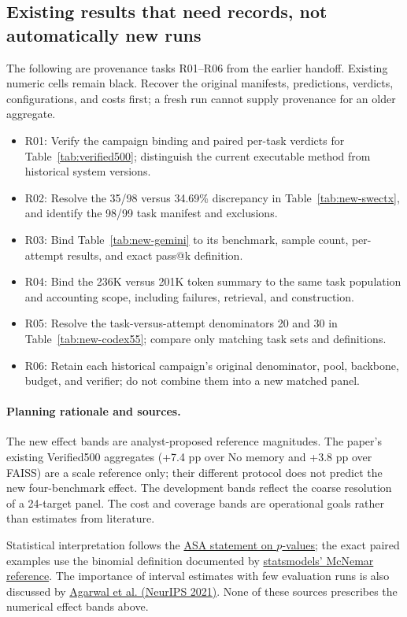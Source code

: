 \subsection{Existing results that need records, not automatically new runs}
The following are provenance tasks R01--R06 from the earlier handoff. Existing
numeric cells remain black. Recover the original manifests, predictions,
verdicts, configurations, and costs first; a fresh run cannot supply provenance
for an older aggregate.
\begin{itemize}
\item R01: Verify the campaign binding and paired per-task verdicts for
Table~\ref{tab:verified500}; distinguish the current executable method from
historical system versions.
\item R02: Resolve the 35/98 versus 34.69\% discrepancy in
Table~\ref{tab:new-swectx}, and identify the 98/99 task manifest and exclusions.
\item R03: Bind Table~\ref{tab:new-gemini} to its benchmark, sample count,
per-attempt results, and exact pass@k definition.
\item R04: Bind the 236K versus 201K token summary to the same task population
and accounting scope, including failures, retrieval, and construction.
\item R05: Resolve the task-versus-attempt denominators 20 and 30 in
Table~\ref{tab:new-codex55}; compare only matching task sets and definitions.
\item R06: Retain each historical campaign's original denominator, pool,
backbone, budget, and verifier; do not combine them into a new matched panel.
\end{itemize}

\paragraph{Planning rationale and sources.}
The new effect bands are analyst-proposed reference magnitudes. The paper's
existing Verified500 aggregates (+7.4 pp over No memory and +3.8 pp over FAISS)
are a scale reference only; their different protocol does not predict the
new four-benchmark effect. The development bands reflect the coarse resolution
of a 24-target panel. The cost and coverage bands are operational goals rather
than estimates from literature.

Statistical interpretation follows the
\href{https://www.amstat.org/asa/files/pdfs/p-valuestatement.pdf}{ASA statement on $p$-values};
the exact paired examples use the binomial definition documented by
\href{https://www.statsmodels.org/stable/generated/statsmodels.stats.contingency_tables.mcnemar.html}{statsmodels' McNemar reference}.
The importance of interval estimates with few evaluation runs is also discussed
by \href{https://proceedings.neurips.cc/paper/2021/hash/f514cec81cb148559cf475e7426eed5e-Abstract.html}{Agarwal et al. (NeurIPS 2021)}.
None of these sources prescribes the numerical effect bands above.

